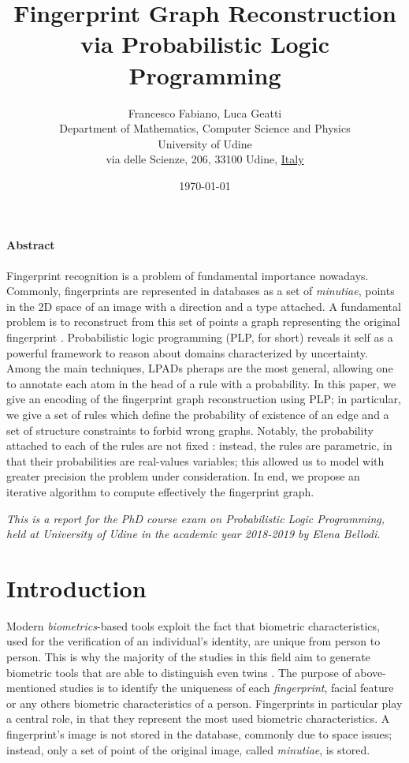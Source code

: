 \documentclass[8pt]{article}
\title{Fingerprint Graph Reconstruction via Probabilistic
       Logic Programming}
\author{
        Francesco Fabiano, Luca Geatti\\
        \footnotesize Department of Mathematics, Computer Science and Physics \\
        \footnotesize University of Udine\\
        \footnotesize via delle Scienze, 206, 33100 Udine, \underline{Italy}
}
\date{\footnotesize\today}
\begin{document}
\maketitle
\paragraph{Abstract}
Fingerprint recognition is a problem of fundamental importance nowadays.
Commonly, fingerprints are represented in databases as a set of
\emph{minutiae}, \ie points in the 2D space of an image with a direction and
a type attached. A fundamental problem is to reconstruct from this set of
points a graph representing the original fingerprint
\cite{isenor1986fingerprint}.  Probabilistic logic programming (PLP, for short)
reveals it self as a powerful framework to reason about domains characterized
by uncertainty. Among the main techniques, LPADs \cite{vennekens2004logic}
pheraps are the most general, allowing one to annotate each atom in the head of
a rule with a probability.  In this paper, we give an encoding of the
fingerprint graph reconstruction using PLP; in particular, we give a set of
rules which define the probability of existence of an edge and a set of
structure constraints to forbid wrong graphs. Notably, the probability attached
to each of the rules are not fixed \apriori: instead, the rules are
parametric, in that their probabilities are real-values variables; this allowed
us to model with greater precision the problem under consideration.  In end, we
propose an iterative algorithm to compute effectively the fingerprint graph. 

\emph{This is a report for the PhD course exam on Probabilistic Logic Programming, 
held at University of Udine in the academic year 2018-2019 by Elena Bellodi.}




\section{Introduction}
Modern \textit{biometrics}-based tools exploit the fact that biometric
characteristics, used for the verification of an individual’s identity, are
unique from person to person.  This is why the majority of the studies in this
field aim to generate biometric tools that are able to distinguish even twins
\cite{}.
%
The purpose of above-mentioned studies is to identify the uniqueness of each
\textit{fingerprint}, facial feature or any others biometric characteristics of
a person. Fingerprints in particular play a central role, in that they
represent the most used biometric characteristics. A fingerprint's image is not
stored in the database, commonly due to space issues; instead, only a set of
point of the original image, called \emph{minutiae}, is stored.
\end{document}
